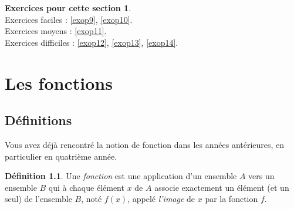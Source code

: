 \documentclass[a4paper,13pt]{scrreprt}
\theoremstyle{plain}
\theoremstyle{definition}
\newtheorem{déf}[subsection]{Définition}
\newtheorem*{epcs}{Exercices pour cette section}
\begin{document}
\begin{epcs}
	~~\\
	Exercices faciles : \ref{exop9}, \ref{exop10}.\\
	Exercices moyens : \ref{exop11}.\\
	Exercices difficiles : \ref{exop12}, \ref{exop13}, \ref{exop14}.
\end{epcs}


\chapter{Les fonctions}

\section{Définitions}

Vous avez déjà rencontré la notion de fonction dans les années antérieures, en particulier en quatrième année.

\begin{déf}
	Une \emph{fonction} est une application d'un ensemble $A$ vers un ensemble $B$ qui à chaque élément $x$ de $A$ associe exactement un élément (et un seul) de l'ensemble $B$, noté $f(x)$, appelé \emph{l'image} de $x$ par la fonction $f$.
\end{déf}
\end{document}
